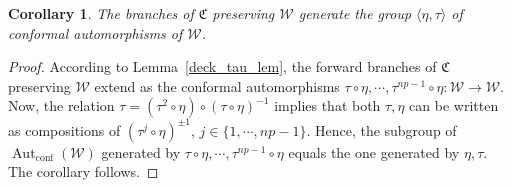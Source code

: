 \documentclass[11pt,a4paper, oneside]{amsart}
\newtheorem{cor}[thm]{Corollary}
\theoremstyle{definition}
\theoremstyle{remark}
\DeclareMathOperator{\Aut}{Aut}
\numberwithin{equation}{section}
\def\cW{\mathcal {W}}
\begin{document}
\begin{cor}\label{corr_group_action_cor}
The branches of $\mathfrak{C}$ preserving $\pmb{\cW}$ generate the group $\langle\eta, \tau\rangle$ of conformal automorphisms of $\pmb{\cW}$.    
\end{cor}
\begin{proof}
    According to Lemma~\ref{deck_tau_lem}, the forward branches of $\mathfrak{C}$ preserving $\pmb{\cW}$ extend as the conformal automorphisms $\tau\circ\eta, \cdots, \tau^{np-1}\circ\eta:\pmb{\cW}\to\pmb{\cW}$. Now, the relation $\tau = (\tau^2\circ\eta)\circ(\tau\circ\eta)^{-1}$ implies that both $\tau,\eta$ can be written as compositions of $\left(\tau^j\circ\eta\right)^{\pm 1}$, $j\in\{1,\cdots,np-1\}$. Hence, the subgroup of $\Aut_{\mathrm{conf}}(\pmb{\cW})$ generated by $\tau\circ\eta, \cdots, \tau^{np-1}\circ\eta$ equals the one generated by $\eta, \tau$.
    The corollary follows.
\end{proof}
\end{document}
